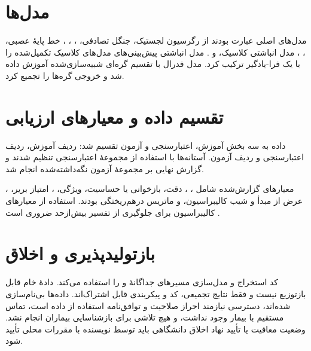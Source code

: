\section{مدل‌ها}
مدل‌های اصلی عبارت بودند از رگرسیون لجستیک، جنگل تصادفی، ، ، ، خط پایۀ عصبی، ، ، مدل انباشتی کلاسیک، و . مدل انباشتی پیش‌بینی‌های مدل‌های کلاسیک تکمیل‌شده را با یک فرا-یادگیر ترکیب کرد. مدل فدرال با تقسیم گره‌ای شبیه‌سازی‌شده آموزش داده شد و خروجی گره‌ها را تجمیع کرد.

\section{تقسیم داده و معیارهای ارزیابی}
داده به سه بخش آموزش، اعتبارسنجی و آزمون تقسیم شد:  ردیف آموزش،  ردیف اعتبارسنجی و  ردیف آزمون. آستانه‌ها با استفاده از مجموعۀ اعتبارسنجی تنظیم شدند و گزارش نهایی بر مجموعۀ آزمون نگه‌داشته‌شده انجام شد.

معیارهای گزارش‌شده شامل ، ، دقت، بازخوانی یا حساسیت، ویژگی، ، امتیاز بریر، ، عرض از مبدأ و شیب کالیبراسیون، و ماتریس درهم‌ریختگی بودند. استفاده از معیارهای کالیبراسیون برای جلوگیری از تفسیر بیش‌ازحد  ضروری است \cite{steyerberg2019clinical,vanCalster2019calibration}.

\section{بازتولیدپذیری و اخلاق}
کد استخراج و مدل‌سازی مسیرهای جداگانۀ \texttt{} و \texttt{} را استفاده می‌کند. دادۀ خام  قابل بازتوزیع نیست و فقط نتایج تجمیعی، کد و پیکربندی قابل اشتراک‌اند. داده‌ها بی‌نام‌سازی شده‌اند، دسترسی نیازمند احراز صلاحیت  و توافق‌نامه استفاده از داده است، تماس مستقیم با بیمار وجود نداشت، و هیچ تلاشی برای بازشناسایی بیماران انجام نشد. وضعیت معافیت یا تأیید نهاد اخلاق دانشگاهی باید توسط نویسنده با مقررات محلی تأیید شود.

